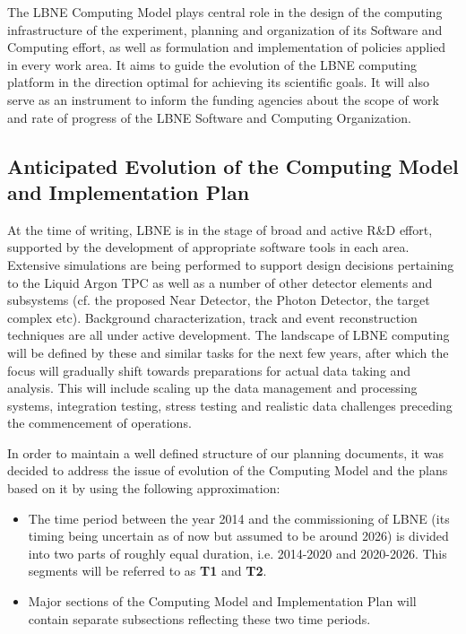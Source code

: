 The LBNE Computing Model plays central role in the design of the computing infrastructure of the experiment, planning and organization of its 
Software and Computing effort, as well as formulation and implementation of policies applied in every work area. It aims to guide 
the evolution of the LBNE computing platform in the direction optimal for achieving its scientific goals. It will also serve
as an instrument to inform the funding agencies about the scope of work and rate of progress of the LBNE Software and 
Computing Organization.

\subsection{Anticipated Evolution of the Computing Model and Implementation Plan}

At the time of writing, LBNE is in the stage of broad and active R\&D effort, supported by the development of appropriate 
software tools in each area. Extensive simulations are being performed to support design decisions pertaining to the Liquid 
Argon TPC as well as a number of other detector elements and subsystems (cf. the proposed Near Detector, the Photon Detector, 
the target complex etc). Background characterization, track and event reconstruction techniques are all under active development. 
The landscape of LBNE computing will be defined by these and similar tasks for  the next few years, after which the focus will 
gradually shift towards preparations for actual data taking and analysis. 
This will include scaling up the data management and processing systems, integration testing, 
stress testing and  realistic data challenges preceding the commencement of operations.

In order to maintain a well defined structure of our planning documents, it was decided to address the issue of evolution of the Computing Model 
and the plans based on it by using the following approximation:

\begin{itemize}

\item The time period between the year 2014 and the commissioning of LBNE (its timing being uncertain as of now but assumed to be around 2026) is divided into two parts of roughly equal duration, i.e. 2014-2020 and 2020-2026. This segments will be referred to as \textbf{T1} and \textbf{T2}.


\item Major sections of the Computing Model and Implementation Plan will contain separate subsections reflecting these two time periods.

\end{itemize}
 
